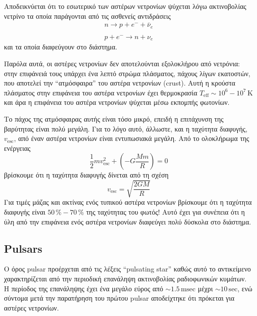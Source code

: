 Αποδεικνύεται ότι το εσωτερικό των αστέρων νετρονίων ψύχεται λόγω ακτινοβολίας νετρίνο τα οποία παράγονται από τις ασθενείς αντιδράσεις
\begin{eqnarray*}
	n \longrightarrow p + e^{-} + \bar{\nu}_e \\ \\
    p + e^{-} \longrightarrow n + \nu_e
\end{eqnarray*}
και τα οποία διαφεύγουν στο διάστημα.

Παρόλα αυτά, οι αστέρες νετρονίων δεν αποτελούνται εξολοκλήρου από νετρόνια: στην επιφάνειά τους υπάρχει ένα λεπτό στρώμα πλάσματος, πάχους λίγων εκατοστών, που αποτελεί την ``ατμόσφαιρα'' του αστέρα νετρονίων (crust). Αυτή η κρούστα πλάσματος στην επιφάνεια του αστέρα νετρονίων έχει θερμοκρασία $T_{\text{eff}}\sim 10^6 - 10^7\,\text{K}$ και άρα η επιφάνεια του αστέρα νετρονίων ψύχεται μέσω εκπομπής φωτονίων.

Το πάχος της ατμόσφαιρας αυτής είναι τόσο μικρό, επειδή η επιτάχυνση της βαρύτητας είναι πολύ μεγάλη. Για το λόγο αυτό, άλλωστε, και η ταχύτητα διαφυγής, $v_{\text{esc}}$, από έναν αστέρα νετρονίων είναι εντυπωσιακά μεγάλη. Από το ολοκλήρωμα της ενέργειας
\begin{equation*}
	\frac{1}{2} m v_{\text{esc}}^2 + \left( - G \frac{M m}{R} \right) = 0
\end{equation*}
βρίσκουμε ότι η ταχύτητα διαφυγής δίνεται από τη σχέση
\begin{equation}
	v_{\text{esc}} = \sqrt{\frac{2GM}{R}}
    \label{eq:escape_velocity}
\end{equation}
Για τιμές μάζας και ακτίνας ενός τυπικού αστέρα νετρονίων βρίσκουμε ότι η ταχύτητα διαφυγής είναι $50\,\% - 70\,\%$ της ταχύτητας του φωτός! Αυτό έχει για συνέπεια ότι η ύλη από την επιφάνεια ενός αστέρα νετρονίων διαφεύγει πολύ δύσκολα στο διάστημα.
 
 \newpage
\subsection{Pulsars}
Ο όρος pulsar προέρχεται από τις λέξεις ``pulsating star'' καθώς αυτό το αντικείμενο χαρακτηρίζεται από την περιοδική επανάληψη ακτινοβολίας ραδιοφωνικών κυμάτων. Η περίοδος της επανάληψης έχει ένα μεγάλο εύρος από $\sim 1.5\,\text{msec}$ μέχρι $\sim 10\,\text{sec}$, ενώ σύντομα μετά την παρατήρηση του πρώτου pulsar αποδείχτηκε ότι πρόκεται για αστέρες νετρονίων.

